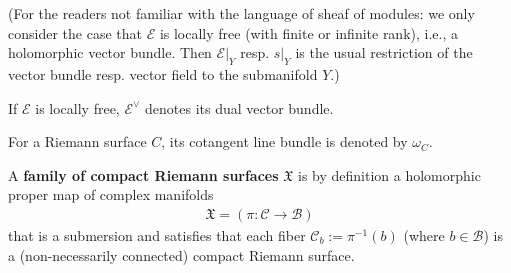 \documentclass[12pt,a4paper,notitlepage]{article}
\theoremstyle{definition}
\theoremstyle{plain}
\newcommand{\fk}{\mathfrak}
\newcommand{\mc}{\mathcal}
\newcommand{\scr}{\mathscr}
\numberwithin{equation}{section}
\begin{document}
(For the readers not familiar with the language of sheaf of modules: we only consider the case that $\scr E$ is locally free (with finite or infinite rank), i.e., a holomorphic vector bundle. Then $\scr E|_Y$ resp. $s|_Y$ is the usual restriction of the vector bundle resp. vector field to the submanifold $Y$.)

If $\scr E$ is locally free, $\scr E^\vee$ denotes its dual vector bundle.

For a Riemann surface $C$, its cotangent line bundle is denoted by $\omega_C$. \index{zz@$\omega_C$, $\omega_{\mc C_b}$}

A \textbf{family of compact Riemann surfaces} $\fk X$ is by definition a holomorphic proper  map of complex manifolds
\begin{align*}
\fk X=(\pi:\mc C\rightarrow\mc B)	
\end{align*}
that is a submersion and satisfies that each fiber $\mc C_b:=\pi^{-1}(b)$ (where $b\in\mc B$) is a (non-necessarily connected) compact Riemann surface.  


\end{document}
